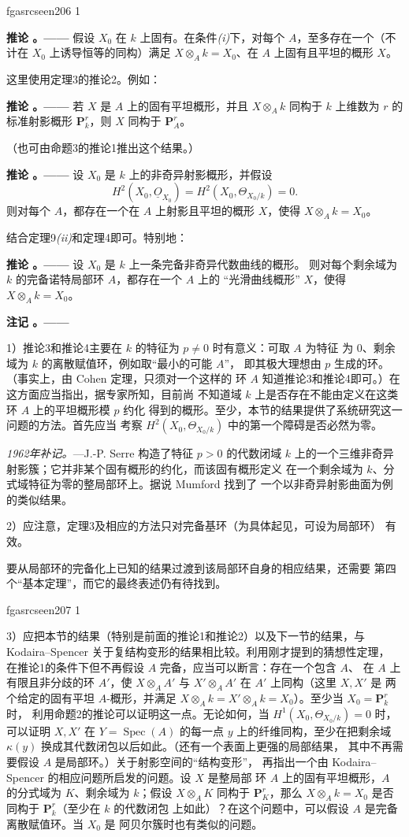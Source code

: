 \documentclass[12pt,twoside,openany]{book}
\numberwithin{equation}{section}
\newcommand{\fgaunitid}{unbound}
\newcommand{\src}[1]{%
  \phantomsection
  \hypertarget{src:\fgaunitid:#1}{}%
  \hypertarget{fga.\fgaunitid.p#1}{}%
  \ifcsname fgasrcseen#1\endcsname\else
    \expandafter\gdef\csname fgasrcseen#1\endcsname{1}%
    \hypertarget{src:#1}{}%
  \fi
  \marginpar{\raggedleft\footnotesize\sffamily #1}%
}
\newcommand{\Osh}{\underline{O}}
\newcommand{\fquote}[1]{“#1”}
\theoremstyle{plain}
\theoremstyle{definition}
\theoremstyle{remark}
\newcommand{\result}[2]{%
  \par\medskip\noindent\textbf{#1%
  \if\relax\detokenize{#2}\relax\else\space#2\fi。——}\enspace
}
\begin{document}
\src{206}
\result{推论}{1} 假设 $X_0$ 在 $k$ 上固有。在条件\textit{(i)}下，对每个
$A$，至多存在一个（不计在 $X_0$ 上诱导恒等的同构）满足
$X\otimes_A k=X_0$、在 $A$ 上固有且平坦的概形 $X$。

这里使用定理3的推论2。例如：

\result{推论}{2} 若 $X$ 是 $A$ 上的固有平坦概形，并且
$X\otimes_A k$ 同构于 $k$ 上维数为 $r$ 的标准射影概形
$\mathbf P_k^r$，则 $X$ 同构于 $\mathbf P_A^r$。

（也可由命题3的推论1推出这个结果。）

\result{推论}{3} 设 $X_0$ 是 $k$ 上的非奇异射影概形，并假设
\[
  H^2(X_0,\Osh_{X_0})=H^2(X_0,\Theta_{X_0/k})=0.
\]
则对每个 $A$，都存在一个在 $A$ 上射影且平坦的概形 $X$，使得
$X\otimes_A k=X_0$。

结合定理9\textit{(ii)}和定理4即可。特别地：

\result{推论}{4} 设 $X_0$ 是 $k$ 上一条完备非奇异代数曲线的概形。
则对每个剩余域为 $k$ 的完备诺特局部环 $A$，都存在一个 $A$ 上的
\fquote{光滑曲线概形} $X$，使得 $X\otimes_A k=X_0$。

\result{注记}{}

1）推论3和推论4主要在 $k$ 的特征为 $p\ne0$ 时有意义：可取 $A$ 为特征
为 $0$、剩余域为 $k$ 的离散赋值环，例如取\fquote{最小的可能 $A$}，
即其极大理想由 $p$ 生成的环。（事实上，由 Cohen 定理，只须对一个这样的
环 $A$ 知道推论3和推论4即可。）在这方面应当指出，据专家所知，目前尚
不知道域 $k$ 上是否存在不能由定义在这类环 $A$ 上的平坦概形模 $p$ 约化
得到的概形。至少，本节的结果提供了系统研究这一问题的方法。首先应当
考察 $H^2(X_0,\Theta_{X_0/k})$ 中的第一个障碍是否必然为零。

\emph{1962年补记。}---J.-P. Serre 构造了特征 $p>0$ 的代数闭域 $k$
上的一个三维非奇异射影簇；它并非某个固有概形的约化，而该固有概形定义
在一个剩余域为 $k$、分式域特征为零的整局部环上。据说 Mumford 找到了
一个以非奇异射影曲面为例的类似结果。

2）应注意，定理3及相应的方法只对完备基环（为具体起见，可设为局部环）
有效。

要从局部环的完备化上已知的结果过渡到该局部环自身的相应结果，还需要
第四个\fquote{基本定理}，而它的最终表述仍有待找到。

\src{207}
3）应把本节的结果（特别是前面的推论1和推论2）以及下一节的结果，与
Kodaira--Spencer 关于复结构变形的结果相比较。利用刚才提到的猜想性定理，
在推论1的条件下但不再假设 $A$ 完备，应当可以断言：存在一个包含 $A$、
在 $A$ 上有限且非分歧的环 $A'$，使
$X\otimes_A A'$ 与 $X'\otimes_A A'$ 在 $A'$ 上同构（这里 $X,X'$ 是
两个给定的固有平坦 $A$-概形，并满足
$X\otimes_A k=X'\otimes_A k=X_0$）。至少当 $X_0=\mathbf P_k^r$ 时，
利用命题2的推论可以证明这一点。无论如何，当
$H^1(X_0,\Theta_{X_0/k})=0$ 时，可以证明 $X,X'$ 在
$Y=\operatorname{Spec}(A)$ 的每一点 $y$ 上的纤维同构，至少在把剩余域
$\kappa(y)$ 换成其代数闭包以后如此。（还有一个表面上更强的局部结果，
其中不再需要假设 $A$ 是局部环。）关于射影空间的\fquote{结构变形}，
再指出一个由 Kodaira--Spencer 的相应问题所启发的问题。设 $X$ 是整局部
环 $A$ 上的固有平坦概形，$A$ 的分式域为 $K$、剩余域为 $k$；假设
$X\otimes_A K$ 同构于 $\mathbf P_K^r$，那么
$X\otimes_A k=X_0$ 是否同构于 $\mathbf P_k^r$（至少在 $k$ 的代数闭包
上如此）？在这个问题中，可以假设 $A$ 是完备离散赋值环。当 $X_0$ 是
阿贝尔簇时也有类似的问题。
\end{document}
